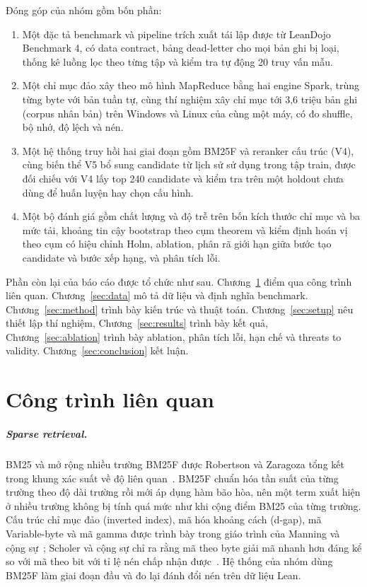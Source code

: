 \documentclass[11pt,a4paper,oneside]{report}
\begin{document}
Đóng góp của nhóm gồm bốn phần:
\begin{enumerate}[leftmargin=*]
  \item Một đặc tả benchmark và pipeline trích xuất tái lập được từ LeanDojo Benchmark 4, có data contract, bảng
        dead-letter cho mọi bản ghi bị loại, thống kê luồng lọc theo từng tập và kiểm tra tự động 20 truy vấn mẫu.
  \item Một chỉ mục đảo xây theo mô hình MapReduce bằng hai engine Spark, trùng từng byte với bản tuần tự, cùng thí
        nghiệm xây chỉ mục tới 3,6 triệu bản ghi (corpus nhân bản) trên Windows và Linux của cùng một máy, có đo
        shuffle, bộ nhớ, độ lệch và nén.
  \item Một hệ thống truy hồi hai giai đoạn gồm BM25F và reranker cấu trúc (V4), cùng biến thể V5 bổ sung candidate từ
        lịch sử sử dụng trong tập train, được đối chiếu với V4 lấy top 240 candidate và kiểm tra trên một holdout chưa
        dùng để huấn luyện hay chọn cấu hình.
  \item Một bộ đánh giá gồm chất lượng và độ trễ trên bốn kích thước chỉ mục và ba mức tải, khoảng tin cậy bootstrap
        theo cụm theorem và kiểm định hoán vị theo cụm có hiệu chỉnh Holm, ablation, phân rã giới hạn giữa bước tạo
        candidate và bước xếp hạng, và phân tích lỗi.
\end{enumerate}

Phần còn lại của báo cáo được tổ chức như sau. Chương~\ref{sec:related} điểm qua công trình liên quan.
Chương~\ref{sec:data} mô tả dữ liệu và định nghĩa benchmark. Chương~\ref{sec:method} trình bày kiến trúc và thuật toán.
Chương~\ref{sec:setup} nêu thiết lập thí nghiệm, Chương~\ref{sec:results} trình bày kết quả, Chương~\ref{sec:ablation}
trình bày ablation, phân tích lỗi, hạn chế và threats to validity. Chương~\ref{sec:conclusion} kết luận.

\chapter{Công trình liên quan}\label{sec:related}

\paragraph{Sparse retrieval.} BM25 và mở rộng nhiều trường BM25F được Robertson và Zaragoza tổng kết trong khung xác
suất về độ liên quan~\cite{robertson2009}. BM25F chuẩn hóa tần suất của từng trường theo độ dài trường rồi mới áp dụng
hàm bão hòa, nên một term xuất hiện ở nhiều trường không bị tính quá mức như khi cộng điểm BM25 của từng trường. Cấu trúc
chỉ mục đảo (inverted index), mã hóa khoảng cách (d-gap), mã Variable-byte và mã gamma được trình bày trong giáo trình của
Manning và cộng sự~\cite{manning2008}; Scholer và cộng sự chỉ ra rằng mã theo byte giải mã nhanh hơn đáng kể so với mã
theo bit với tỉ lệ nén chấp nhận được~\cite{scholer2002}. Hệ thống của nhóm dùng BM25F làm giai đoạn đầu và đo lại đánh
đổi nén trên dữ liệu Lean.
\end{document}

